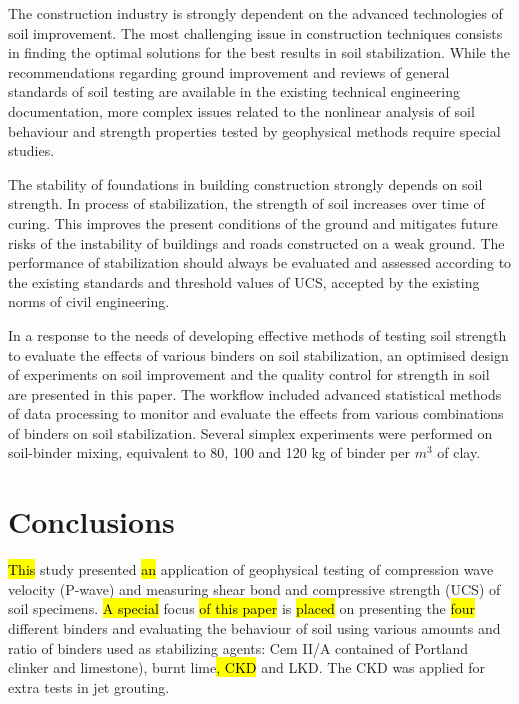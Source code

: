 \documentclass[USenglish,twocolumn]{article}
\begin{document}
The construction industry is strongly dependent on the advanced technologies of soil improvement. The most challenging issue in construction techniques consists in finding the optimal solutions for the best results in soil stabilization. While the recommendations regarding ground improvement and reviews of general standards of soil testing are available in the existing technical engineering documentation, more complex issues related to the nonlinear analysis of soil behaviour and strength properties tested by geophysical methods require special studies.  

The stability of foundations in building construction strongly depends on soil strength. In process of stabilization, the strength of soil increases over time of curing. This improves the present conditions of the ground and mitigates future risks of the instability of buildings and roads constructed on a weak ground. The performance of stabilization should always be evaluated and assessed according to the existing standards and threshold values of UCS, accepted by the existing norms of civil engineering. 

In a response to the needs of developing effective methods of testing soil strength to evaluate the effects of various binders on soil stabilization, an optimised design of experiments on soil improvement and the quality control for strength in soil are presented in this paper. The workflow included advanced statistical methods of data processing to monitor and evaluate the effects from various combinations of binders on soil stabilization. Several simplex experiments were performed on soil-binder mixing, equivalent to 80, 100 and 120 kg of binder per $m^3$ of clay.

\section{Conclusions}

 \hl{This }study presented \hl{an} application of geophysical testing of compression wave velocity (P-wave) and measuring\hl{ }shear bond and compressive strength (UCS) of soil specimens. \hl{A special }focus \hl{of this paper} is \hl{placed }on presenting the \hl{four} different binders and evaluating the behaviour of soil using various amounts and ratio of binders used as stabilizing agents: Cem II/A contained of Portland clinker and limestone), burnt lime\hl{, CKD} and LKD. The CKD was applied for extra tests in jet grouting. 
\end{document}
